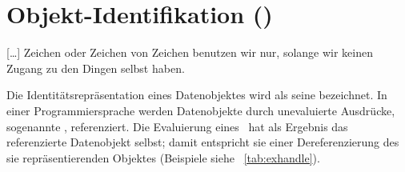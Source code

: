 \section{Objekt-Identifikation (\protect\objid)}%
\label{sec:handle}
%
\begin{fortune}
{[\ldots]} Zeichen oder Zeichen von Zeichen benutzen wir nur,
solange wir keinen Zugang zu den Dingen selbst haben.
\end{fortune}
%
Die Identit\"{a}tsrepr\"{a}sentation eines Datenobjektes wird als seine
\objid\/ bezeichnet. In einer Programmiersprache werden Datenobjekte
durch unevaluierte Ausdr\"{u}cke, sogenannte \handle[s],
referenziert. Die Evaluierung eines \handle\ hat als Ergebnis das
referenzierte Datenobjekt selbst; damit entspricht sie einer
Dereferenzierung des sie repr\"{a}sentierenden Objektes
\cite[]{bib:he89} (Beispiele siehe
\tablename~\ref{tab:exhandle}).
%
